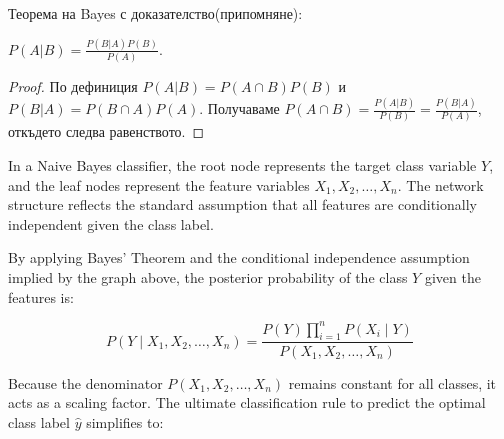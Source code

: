 	Теорема на Bayes с доказателство(припомняне): 
	\begin{theorem}[Bayes]
		$P(A|B) = \frac{P(B|A)P(B)}{P(A)}.$
	\end{theorem}
	\begin{proof}
		По дефиниция $P(A|B) = P(A\cap B)P(B)$ и $P(B|A) = P(B\cap A)P(A)$. Получаваме
		$P(A\cap B)= \frac{P(A|B) }{P(B)} = \frac{P(B|A) }{P(A)}$, откъдето следва равенството.
	\end{proof}
	
			
		

		In a Naive Bayes classifier, the root node represents the target class variable $Y$, and the leaf nodes represent the feature variables $X_1, X_2, \dots, X_n$. The network structure reflects the standard assumption that all features are conditionally independent given the class label.
		
		\begin{center}
		\end{center}
		
		By applying Bayes' Theorem and the conditional independence assumption implied by the graph above, the posterior probability of the class $Y$ given the features is:
		
		\begin{equation}
		P(Y \mid X_1, X_2, \dots, X_n) = \frac{P(Y) \prod_{i=1}^{n} P(X_i \mid Y)}{P(X_1, X_2, \dots, X_n)}
		\end{equation}
		
		Because the denominator $P(X_1, X_2, \dots, X_n)$ remains constant for all classes, it acts as a scaling factor. The ultimate classification rule to predict the optimal class label $\hat{y}$ simplifies to:
		
